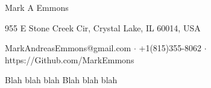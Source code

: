 \documentclass[11pt]{article}
\begin{document}
\centerline{\LARGE Mark A Emmons}
\centerline{955 E Stone Creek Cir, Crystal Lake, IL 60014, USA}
\centerline{MarkAndreasEmmons@gmail.com $\cdot$ +1(815)355-8062 $\cdot$ https://Github.com/MarkEmmons}

\smallskip
\noindent
Blah blah blah
\bigskip
{}
\smallskip
\noindent
Blah blah blah

\end{document}
